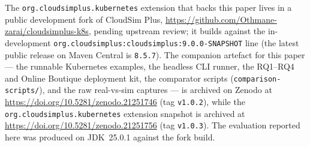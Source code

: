 \documentclass[ASNA,twocolumn]{USG}
\begin{document}
    The \texttt{org.cloudsimplus.kubernetes} extension that backs this paper
    lives in a public development fork of CloudSim Plus,
    \url{https://github.com/Othmane-zarai/cloudsimplus-k8s}, pending upstream
    review; it builds against the in-development
    \texttt{org.cloudsimplus:cloudsimplus:9.0.0-SNAPSHOT} line (the latest
    public release on Maven Central is \texttt{8.5.7}). The companion
    artefact for this paper --- the runnable Kubernetes examples, the headless
    CLI runner, the RQ1--RQ4 and Online Boutique deployment kit, the
    comparator scripts (\texttt{comparison-scripts/}), and the raw real-vs-sim
    captures --- is archived on Zenodo at
    \url{https://doi.org/10.5281/zenodo.21251746} (tag \texttt{v1.0.2}),
    while the \texttt{org.cloudsimplus.kubernetes}
    extension snapshot is archived at
    \url{https://doi.org/10.5281/zenodo.21251756} (tag \texttt{v1.0.3}).
    The evaluation reported here was produced on
    JDK~25.0.1 against the fork build.

    
\end{document}
